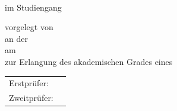 \begin{titlepage}
  \centering


  \vspace{20mm}
  {\huge\MakeUppercase{\getDoctype{}}}\\

  \vspace*{5mm}
  {\large im Studiengang \getCourseOfStudies{}}

  \vspace{15mm}
  {\huge\bfseries \getTitle{}}

  \vspace*{15mm}
  vorgelegt von \getAuthor{} \\
  an der \getUniversity{} \\
  am \getSubmissionDate{} \\
  zur Erlangung des akademischen Grades eines \getAcademicDegree{}

  \vspace{15mm}
  \begin{tabular}{l l}
    Erstprüfer:      & \getSupervisor{} \\
    Zweitprüfer:     & \getAdvisor{} \\
  \end{tabular}

\end{titlepage}
